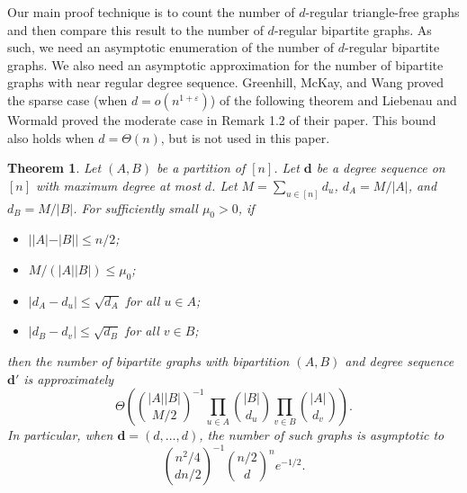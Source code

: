 \documentclass[11pt]{article}
\newcommand{\eps}{\varepsilon}
\theoremstyle{plain}
\newtheorem{thm}{Theorem}[section]
\begin{document}
Our main proof technique is to count the number of $d$-regular triangle-free graphs and then compare this result to the number of $d$-regular bipartite graphs. As such, we need an asymptotic enumeration of the number of $d$-regular bipartite graphs. We also need an asymptotic approximation for the number of bipartite graphs with near regular degree sequence.
Greenhill, McKay, and Wang \cite{GREENHILL2006291} proved the sparse case (when $d = o(n^{1 + \eps})$) of the following theorem and Liebenau and Wormald \cite{liebenau2023asymptotic} proved the moderate case in Remark 1.2 of their paper. This bound also holds when $d = \Theta(n)$, but is not used in this paper.
\begin{thm}\label{thm: bip enum}\cite{GREENHILL2006291,liebenau2023asymptotic}
    Let $(A,B)$ be a partition of $[n]$. Let $\mathbf d$ be a degree sequence on $[n]$ with maximum degree at most $d$. Let $M = \sum_{u \in [n]}d_u$, $d_A= M/|A|$, and $d_B = M/|B|$. For sufficiently small $\mu_0 > 0$, if 
    \begin{itemize}
        \item $||A| - |B|| \leq n/2$;
        \item $M/(|A||B|) \leq \mu_0$;
        \item $|d_A - d_u| \leq \sqrt{d_A}$ for all $u \in A$;
        \item  $|d_B - d_v| \leq \sqrt{d_B}$ for all $v \in B$;
    \end{itemize}  
    then the number of bipartite graphs with bipartition $(A,B)$ and degree sequence $\mathbf d'$ is approximately
    \[
    \Theta\left({|A||B| \choose M/2}^{-1}\prod_{u \in A}{|B| \choose d_u} \prod_{v \in B}{|A| \choose d_v}\right).
    \]
    In particular, when $\mathbf d = (d, \ldots, d)$, the number of such graphs is asymptotic to 
    \begin{equation}\label{eq: reg bip}
        \binom{n^2/4}{dn/2}^{-1}\binom{n/2}{d}^ne^{-1/2}.
    \end{equation}
\end{thm}
\end{document}
